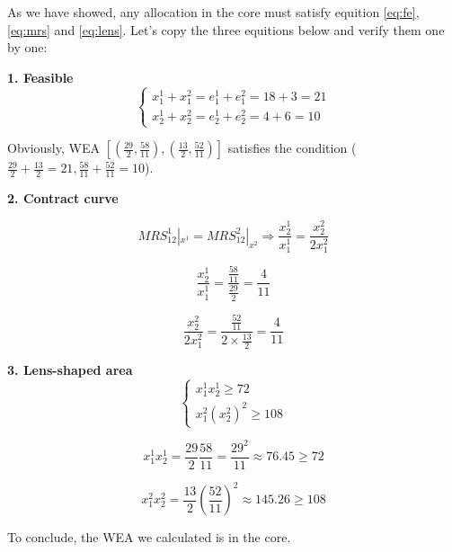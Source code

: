 \documentclass{article}
\begin{document}
As we have showed, any allocation in the core must satisfy equition \ref{eq:fe}, \ref{eq:mrs} and \ref{eq:lens}. Let's copy the three equitions below and verify them one by one:

\vspace{2mm}

\textbf{1. Feasible}
\begin{equation}
    \begin{cases}
x^1_1+x^2_1= e^1_1 +e^2_1 = 18+3 =21 \\
x^1_2+x^2_2= e^1_2 +e^2_2 = 4+6 =10
    \end{cases}
\nonumber
\end{equation}

Obviously, WEA $[(\frac{29}{2},\frac{58}{11} ),(\frac{13}{2},\frac{52}{11})]$ satisfies the condition
($\frac{29}{2}+\frac{13}{2}=21,\frac{58}{11} +\frac{52}{11}=10$).

\vspace{2mm}

\textbf{2. Contract curve}

\begin{equation}
MRS^1_{12} |_{x^1} = MRS^2_{12}|_{x^2} \Rightarrow
\frac{x^1_2}{x^1_1} = \frac{x^2_2}{2x^2_1}
\nonumber
\end{equation}

$$\frac{x^1_2}{x^1_1} = \frac{\frac{58}{11}}{\frac{29}{2}} = \frac{4}{11}$$

$$\frac{x^2_2}{2x^2_1} = \frac{\frac{52}{11}}{2 \times \frac{13}{2}}= \frac{4}{11}$$

\vspace{2mm}

\textbf{3. Lens-shaped area}
\begin{equation}
    \begin{cases}
x^1_1 x^1_2 \ge 72 \\
x^2_1 (x^2_2)^2 \ge 108    \end{cases}
\nonumber
\end{equation}

$$x^1_1 x^1_2 = \frac{29}{2} \frac{58}{11} = \frac{29^2}{11} \approx 76.45 \ge 72$$

$$x^2_1 x^2_2 = \frac{13}{2} (\frac{52}{11})^2  \approx 145.26 \ge 108$$

To conclude, the WEA we calculated is in the core.
\end{document}
